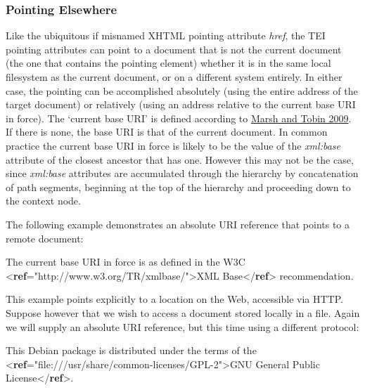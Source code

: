 \subsubsection[{Pointing Elsewhere}]{Pointing Elsewhere}\label{SAUR}\par
Like the ubiquitous if misnamed XHTML pointing attribute {\itshape href}, the TEI pointing attributes can point to a document that is not the current document (the one that contains the pointing element) whether it is in the same local filesystem as the current document, or on a different system entirely. In either case, the pointing can be accomplished absolutely (using the entire address of the target document) or relatively (using an address relative to the current base URI in force). The ‘current base URI’ is defined according to \hyperref[XMLBASE]{Marsh and Tobin 2009}. If there is none, the base URI is that of the current document. In common practice the current base URI in force is likely to be the value of the {\itshape xml:base} attribute of the closest ancestor that has one. However this may not be the case, since {\itshape xml:base} attributes are accumulated through the hierarchy by concatenation of path segments, beginning at the top of the hierarchy and proceeding down to the context node.\par
The following example demonstrates an absolute URI reference that points to a remote document: \par\bgroup{}\exampleFont \begin{shaded}\noindent\mbox{}The current base URI in force is as defined in the\mbox{}\newline 
 W3C {<\textbf{ref}\hspace*{1em}{target}="{http://www.w3.org/TR/xmlbase/}">}XML\mbox{}\newline 
 Base{</\textbf{ref}>} recommendation.\end{shaded}\egroup\par \par
This example points explicitly to a location on the Web, accessible via HTTP. Suppose however that we wish to access a document stored locally in a file. Again we will supply an absolute URI reference, but this time using a different protocol: \par\bgroup{}\exampleFont \begin{shaded}\noindent\mbox{}This Debian package is distributed under the terms\mbox{}\newline 
 of the {<\textbf{ref}\hspace*{1em}{target}="{file:///usr/share/common-licenses/GPL-2}">}GNU General Public License{</\textbf{ref}>}.\end{shaded}\egroup\par \par
